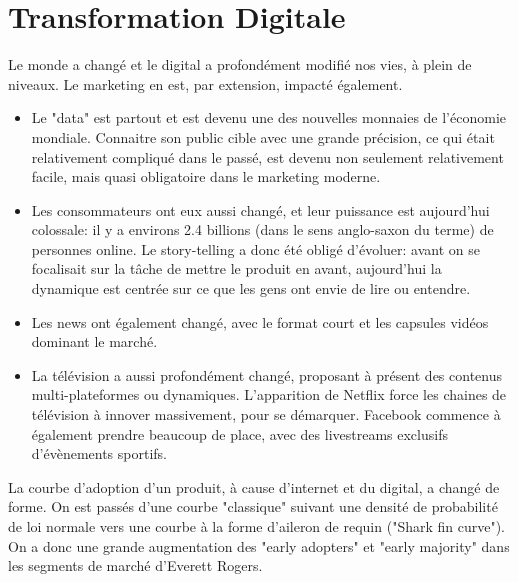 \vspace{-1.2cm}

\section{Transformation Digitale}

Le monde a changé et le digital a profondément modifié nos vies, à plein de niveaux. Le marketing en est, par extension, impacté également.\\

\begin{itemize}
    \item Le "data" est partout et est devenu une des nouvelles monnaies de l'économie mondiale. Connaitre son public cible avec une grande précision, ce qui était relativement compliqué dans le passé, est devenu non seulement relativement facile, mais quasi obligatoire dans le marketing moderne.
    \item  Les consommateurs ont eux aussi changé, et leur puissance est aujourd'hui colossale: il y a environs 2.4 billions (dans le sens anglo-saxon du terme) de personnes online. Le story-telling a donc été obligé d'évoluer: avant on se focalisait sur la tâche de mettre le produit en avant, aujourd'hui la dynamique est centrée sur ce que les gens ont envie de lire ou entendre.
    \item Les news ont également changé, avec le format court et les capsules vidéos dominant le marché.
    \item La télévision a aussi profondément changé, proposant à présent des contenus multi-plateformes ou dynamiques. L'apparition de Netflix force les chaines de télévision à innover massivement, pour se démarquer. Facebook commence à également prendre beaucoup de place, avec des livestreams exclusifs d'évènements sportifs.\\
\end{itemize}

La courbe d'adoption d'un produit, à cause d'internet et du digital, a changé de forme. On est passés d'une courbe "classique" suivant une densité de probabilité de loi normale vers une courbe à la forme d'aileron de requin ("Shark fin curve"). On a donc une grande augmentation des "early adopters" et "early majority" dans les segments de marché d'Everett Rogers.

